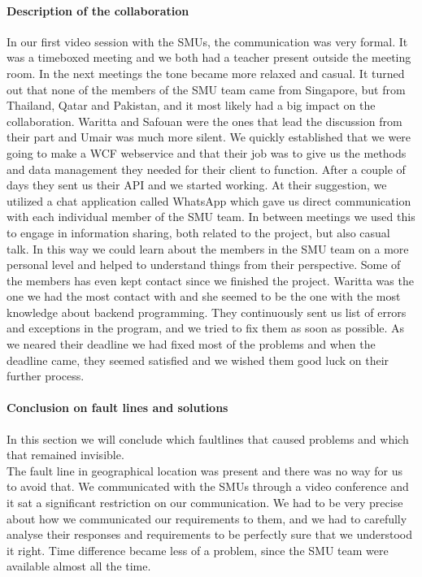 \documentclass[a4paper,11pt,report]{article}
\begin{document}
\paragraph{Description of the collaboration }
In our first video session with the SMUs, the communication was very formal. It was a timeboxed meeting and we both had a teacher present outside the meeting room. In the next meetings the tone became more relaxed and casual. It turned out that none of the members of the SMU team came from Singapore, but from Thailand, Qatar and Pakistan, and it most likely had a big impact on the collaboration. Waritta and Safouan were the ones that lead the discussion from their part and Umair was much more silent. We quickly established that we were going to make a WCF webservice and that their job was to give us the methods and data management they needed for their client to function. After a couple of days they sent us their API and we started working. At their suggestion, we utilized a chat application called WhatsApp\cite{whatsapp} which gave us direct communication with each individual member of the SMU team. In between meetings we used this to engage in information sharing, both related to the project, but also casual talk. In this way we could learn about the members in the SMU team on a more personal level and helped to understand things from their perspective. Some of the members has even kept contact since we finished the project. Waritta was the one we had the most contact with and she seemed to be the one with the most knowledge about backend programming. They continuously sent us list of errors and exceptions in the program, and we tried to fix them as soon as possible. As we neared their deadline we had fixed most of the problems and when the deadline came, they seemed satisfied and we wished them good luck on their further process. \\

\paragraph{Conclusion on fault lines and solutions}
In this section we will conclude which faultlines that caused problems and which that remained invisible. \\

The fault line in geographical location was present and there was no way for us to avoid that. We communicated with the SMUs through a video conference and it sat a significant restriction on our communication. We had to be very precise about how we communicated our requirements to them, and we had to carefully analyse their responses and requirements to be perfectly sure that we understood it right. Time difference became less of a problem, since the SMU team were available almost all the time. \\
\end{document}
